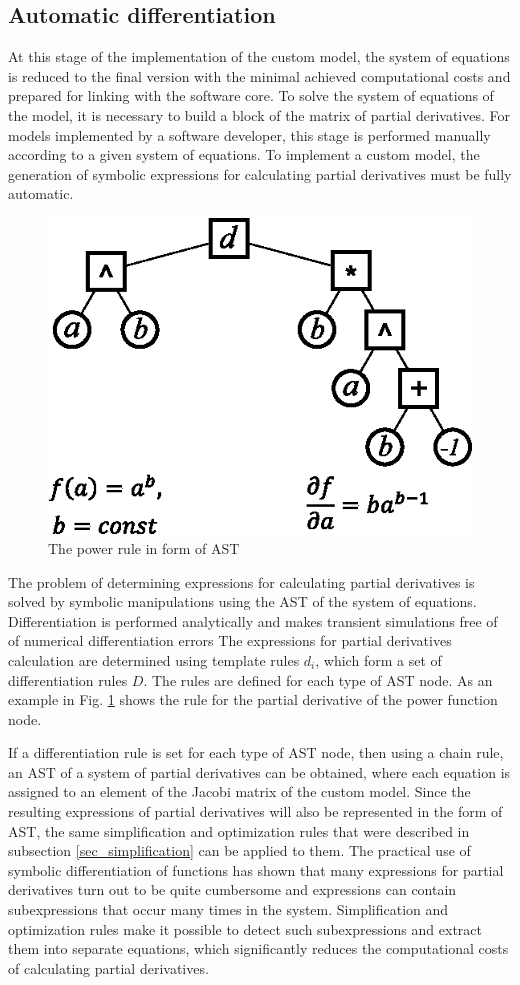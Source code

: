 \documentclass[lettersize,journal]{IEEEtran}
\begin{document}
\subsection{Automatic differentiation}

At this stage of the implementation of the custom model, the system of equations is reduced to the final version with the minimal achieved
computational costs and prepared for linking with the software core. To solve the system of equations of the model, it is necessary to build 
a block of the matrix of partial derivatives. For models implemented by a software developer, this stage is performed manually according 
to a given system of equations. To implement a custom model, the generation of symbolic expressions for calculating partial 
derivatives must be fully automatic.

\begin{figure}[h]
	\centering
	\includegraphics[width=.7\columnwidth]{derivative.eps}
	\caption{The power rule in form of AST}
	\label{fig_dpower}
\end{figure}

The problem of determining expressions for calculating partial derivatives is solved by symbolic manipulations using the AST of the system of equations.
Differentiation is performed analytically and makes transient simulations free of of numerical differentiation errors 
The expressions for partial derivatives calculation are determined using template rules \(d_i\), which form a set of differentiation 
rules \(D\). The rules are defined for each type of AST node. As an example in Fig. \ref{fig_dpower} shows the rule for the partial 
derivative of the power function node.

If a differentiation rule is set for each type of AST node, then using a chain rule, an AST of a system of partial derivatives can be
obtained, where each equation is assigned to an element of the Jacobi matrix of the custom model. Since the resulting expressions of partial 
derivatives will also be represented in the form of AST, the same simplification and optimization rules that were described in 
subsection \ref{sec_simplification} can be applied to them. The practical use of symbolic differentiation of functions has shown that many 
expressions for partial derivatives turn out to be quite cumbersome and expressions can contain subexpressions that occur many times in the system. 
Simplification and optimization rules make it possible to detect such subexpressions and extract them into separate equations, which significantly
reduces the computational costs of calculating partial derivatives.
\end{document}
